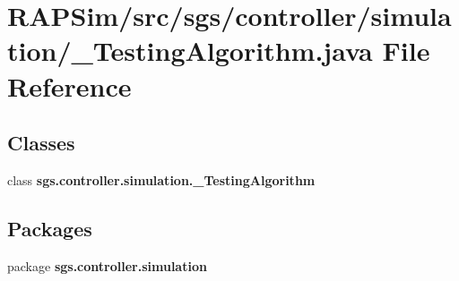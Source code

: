 \section{R\-A\-P\-Sim/src/sgs/controller/simulation/\-\_\-\-Testing\-Algorithm.java File Reference}
\label{___testing_algorithm_8java}
\subsection*{Classes}
\begin{DoxyCompactItemize}
\item 
class {\bf sgs.\-controller.\-simulation.\-\_\-\-Testing\-Algorithm}
\end{DoxyCompactItemize}
\subsection*{Packages}
\begin{DoxyCompactItemize}
\item 
package {\bf sgs.\-controller.\-simulation}
\end{DoxyCompactItemize}
